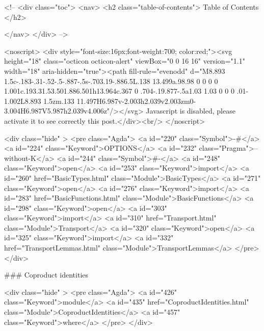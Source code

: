   <!-- 
  <div class="toc">
    <nav>
    <h2 class="table-of-contents"> Table of Contents </h2>
      

    </nav>
  </div>
   -->

  <noscript>
  <div style="font-size:16px;font-weight:700; color:red;"><svg height="18" class="octicon octicon-alert" viewBox="0 0 16 16" version="1.1" width="18" aria-hidden="true"><path fill-rule="evenodd" d="M8.893 1.5c-.183-.31-.52-.5-.887-.5s-.703.19-.886.5L.138 13.499a.98.98 0 0 0 0 1.001c.193.31.53.501.886.501h13.964c.367 0 .704-.19.877-.5a1.03 1.03 0 0 0 .01-1.002L8.893 1.5zm.133 11.497H6.987v-2.003h2.039v2.003zm0-3.004H6.987V5.987h2.039v4.006z"/></svg> Javascript is disabled, please activate it to see correctly this post.</div><br/>
  </noscript>

  <div class="hide" >
<pre class="Agda">
<a id="220" class="Symbol">{-#</a> <a id="224" class="Keyword">OPTIONS</a> <a id="232" class="Pragma">--without-K</a> <a id="244" class="Symbol">#-}</a>
<a id="248" class="Keyword">open</a> <a id="253" class="Keyword">import</a> <a id="260" href="BasicTypes.html" class="Module">BasicTypes</a>
<a id="271" class="Keyword">open</a> <a id="276" class="Keyword">import</a> <a id="283" href="BasicFunctions.html" class="Module">BasicFunctions</a>
<a id="298" class="Keyword">open</a> <a id="303" class="Keyword">import</a> <a id="310" href="Transport.html" class="Module">Transport</a>
<a id="320" class="Keyword">open</a> <a id="325" class="Keyword">import</a> <a id="332" href="TransportLemmas.html" class="Module">TransportLemmas</a>
</pre>
</div>

### Coproduct identities

<div class="hide" >
<pre class="Agda">
<a id="426" class="Keyword">module</a>
  <a id="435" href="CoproductIdentities.html" class="Module">CoproductIdentities</a>
  <a id="457" class="Keyword">where</a>
</pre>
</div>

